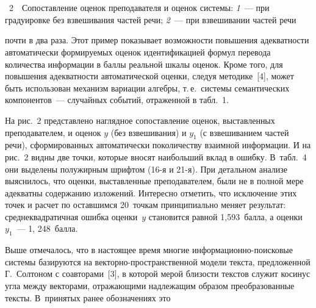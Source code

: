 \begin{multicols}{2}
\pagebreak

\

\vspace*{-12pt}

\begin{center}  %
\mbox{%
 \epsfxsize=80mm
 }
 \end{center}
 \vspace*{-2pt}
{{\figurename~2}\ \ \small{Сопоставление оценок преподавателя и оценок системы:
\textit{1}~--- при градуировке без взвешивания частей речи; \textit{2}~--- при взвешивании 
частей речи}}


\vspace*{9pt}

\addtocounter{figure}{1}


\noindent
 почти в два раза. Этот пример 
показывает возможности повышения адекватности автоматически формируемых 
оценок идентификацией формул перевода количества информации в баллы 
реальной шкалы оценок. Кроме того, для повышения адекватности автоматической 
оценки, следуя методике~[4], может быть использован механизм вариации алгебры, 
т.\,е.\ системы семантических компонентов~--- случайных событий, отраженной в 
табл.~1. 

На рис.~2 представлено наглядное сопоставление оценок, выставленных 
преподавателем, и оценок $y$ (без взвешивания) и $y_1$ (с взвешиванием час\-тей 
речи), сформированных автоматически по\linebreak количеству взаимной информации. И на 
рис.~2 видны две точки, которые вносят наибольший вклад в ошибку. В~табл.~4 
они выделены полужирным шрифтом (16-я и 21-я). При детальном анализе 
выяснилось, что оценки, выставленные преподавателем, были не в полной мере 
адекватны содержанию изложений. Интересно отметить, что исключение этих точек 
и расчет по оставшимся 20~точ\-кам принципиально меняет результат: 
среднеквадратичная ошибка оценки~$y$ становится равной 1,593~балла, а оценки 
$y_1$~--- 1, 248~балла. 
     
     
     Выше отмечалось, что в настоящее время многие 
     ин\-фор\-ма\-ци\-он\-но-по\-иско\-вые системы базируются на 
     век\-тор\-но-про\-стран\-ст\-вен\-ной модели текс\-та, предложенной Г.~Солтоном
     с соавторами~[3], в которой мерой 
близости текстов служит косинус угла между векторами, отражающими 
надлежащим образом преобразованные тексты. В~принятых ранее обозначениях это 


\end{multicols}
